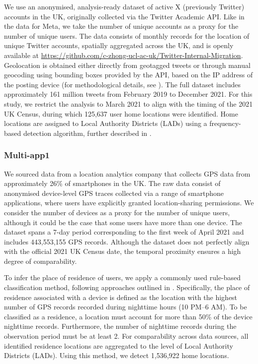 \documentclass[]{rsos}%
\begin{document}
We use an anonymised, analysis-ready dataset of active X (previously
Twitter) accounts in the UK, originally collected via the Twitter
Academic API. Like in the data for Meta, we take the number of unique
accounts as a proxy for the number of unique users. The data consists of
monthly records for the location of unique Twitter accounts, spatially
aggregated across the UK, and is openly available at
\url{https://github.com/c-zhong-ucl-ac-uk/Twitter-Internal-Migration}.
Geolocation is obtained either directly from geotagged tweets or through
manual geocoding using bounding boxes provided by the API, based on the
IP address of the posting device (for methodological details, see
\citep{wang2022}). The full dataset includes approximately 161 million tweets
from February 2019 to December 2021. For this study, we restrict the
analysis to March 2021 to align with the timing of the 2021 UK Census,
during which 125,637 user home locations were identified. Home locations
are assigned to Local Authority Districts (LADs) using a frequency-based
detection algorithm, further described in \citep{wang2022}.

\subsubsection{Multi-app1}\label{multi-app1}

We sourced data from a location analytics company that collects GPS data
from approximately 26\% of smartphones in the UK. The raw data consist of
anonymised device-level GPS traces collected via a range of smartphone
applications, where users have explicitly granted location-sharing
permissions. We consider the number of devices as a proxy for the number
of unique users, although it could be the case that some users have more
than one device. The dataset spans a 7-day period corresponding to the
first week of April 2021 and includes 443,553,155 GPS records. Although
the dataset does not perfectly align with the official 2021 UK Census
date, the temporal proximity ensures a high degree of comparability.

To infer the place of residence of users, we apply a commonly used
rule-based classification method, following approaches outlined in
\citep{wang2022, zhong24working}. Specifically, the place of residence
associated with a device is defined as the location with the highest
number of GPS records recorded during nighttime hours (10 PM--6 AM). To
be classified as a residence, a location must account for more than 50\%
of the device nighttime records. Furthermore, the number of nighttime
records during the observation period must be at least 2. For
comparability across data sources, all identified residence locations
are aggregated to the level of Local Authority Districts (LADs). Using
this method, we detect 1,536,922 home locations.
\end{document}
